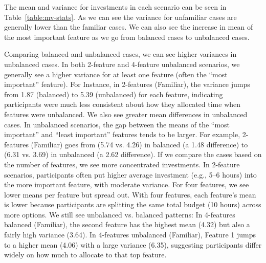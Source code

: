 The mean and variance for investments in each scenario can be seen in Table~\ref{table:mv-stats}. As we can see the variance for unfamiliar cases are generally lower than the familiar cases. We can also see the increase in mean of the most important feature as we go from balanced cases to unbalanced cases. 

Comparing balanced and unbalanced cases, we can see higher variances in unbalanced cases. In both 2-feature and 4-feature unbalanced scenarios, we generally see a higher variance for at least one feature (often the ``most important'' feature). For Instance, in 2-features (Familiar), the variance jumps from 1.87 (balanced) to 5.39 (unbalanced) for each feature, indicating participants were much less consistent about how they allocated time when features were unbalanced. We also see greater mean differences in unbalanced cases. In unbalanced scenarios, the gap between the means of the ``most important'' and ``least important'' features tends to be larger. For example, 2-features (Familiar) goes from (5.74 vs. 4.26) in balanced (a 1.48 difference) to (6.31 vs. 3.69) in unbalanced (a 2.62 difference). 
If we compare the cases based on the number of features, we see more concentrated investments. In 2-feature scenarios, participants often put higher average investment (e.g., 5–6 hours) into the more important feature, with moderate variance. For four features, we see lower means per feature but spread out. With four features, each feature's mean is lower because participants are splitting the same total budget (10 hours) across more options. We still see unbalanced vs. balanced patterns: In 4-features balanced (Familiar), the second feature has the highest mean (4.32) but also a fairly high variance (3.64). In 4-features unbalanced (Familiar), Feature 1 jumps to a higher mean (4.06) with a large variance (6.35), suggesting participants differ widely on how much to allocate to that top feature.
